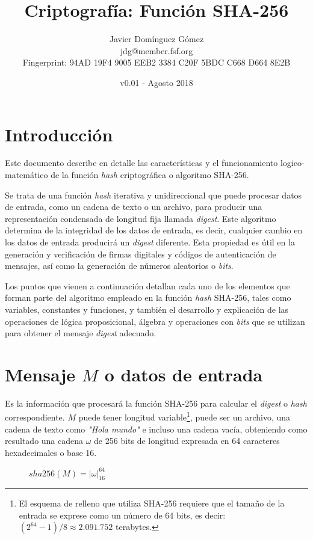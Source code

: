 \documentclass{article}
\title{\textbf{Criptografía: Función SHA-256}}
\author{Javier Domínguez Gómez \\
\small{jdg@member.fsf.org} \\
\small{Fingerprint: 94AD 19F4 9005 EEB2 3384 C20F 5BDC C668 D664 8E2B}}
\date{v0.01 - Agosto 2018}
\begin{document}
\maketitle

\tableofcontents{}

\section{Introducción}
    Este documento describe en detalle las características y el funcionamiento logico-matemático de la función \textit{hash} criptográfica o algoritmo SHA-256.
    
    \vspace{3mm}
    Se trata de una función \textit{hash} iterativa y unidireccional que puede procesar datos de entrada, como un cadena de texto o un archivo, para producir una representación condensada de longitud fija llamada \textit{digest}. Este algoritmo determina de la integridad de los datos de entrada, es decir, cualquier cambio en los datos de entrada producirá un \textit{digest} diferente. Esta propiedad es útil en la generación y verificación de firmas digitales y códigos de autenticación de mensajes, así como la generación de números aleatorios o \textit{bits}.
    
    \vspace{3mm}
    Los puntos que vienen a continuación detallan cada uno de los elementos que forman parte del algoritmo empleado en la función \textit{hash} SHA-256, tales como variables, constantes y funciones, y también el desarrollo y explicación de las operaciones de lógica proposicional, álgebra y operaciones con \textit{bits} que se utilizan para obtener el mensaje \textit{digest} adecuado.

\section{Mensaje $M$ o datos de entrada}
    Es la información que procesará la función SHA-256 para calcular el \textit{digest} o \textit{hash} correspondiente. $M$ puede tener longitud variable\footnote{El esquema de relleno que utiliza SHA-256 requiere que el tamaño de la entrada se exprese como un número de 64 bits, es decir: $(2^{64}-1)/8 \approx 2.091.752$ terabytes.}, puede ser un archivo, una cadena de texto como \textit{"Hola mundo"} e incluso una cadena vacía, obteniendo como resultado una cadena $\omega$ de 256 bits de longitud expresada en 64 caracteres hexadecimales o base 16.
        \begin{figure}[H]
        \centering
            $sha256(M) = |\omega|^{64}_{16}$
        \end{figure}
        
\end{document}
